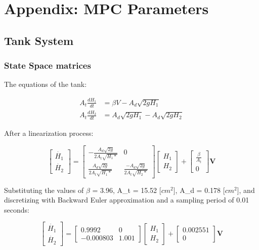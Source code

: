 \chapter{Appendix: MPC Parameters}
\label{chap:Appendix_A}

\section{Tank System}

\subsection{State Space matrices}

The equations of the tank:

\begin{equation}
\begin{align}
A_t\frac{dH_1}{dt} &= \beta V - A_d \sqrt{2gH_1} \\
A_t\frac{dH_2}{dt} &= A_d\sqrt{2gH_1} - A_d\sqrt{2gH_2}
\end{align}
\end{equation}

After a linearization process:

\begin{equation} \label{eq:appendix1}
\begin{bmatrix} \dot{H_1} \\ \dot{H_2} \end{bmatrix} = \begin{bmatrix} -\frac{A_d \sqrt{2g}}{2A_t \sqrt{H_{1}*}} & 0  \\ \frac{A_d \sqrt{2g}}{2A_t \sqrt{H_{1}*}} & \frac{-A_d \sqrt{2g}}{2A_t \sqrt{H_{2}*}} \end{bmatrix} \begin{bmatrix} H_1 \\ H_2 \end{bmatrix} + \begin{bmatrix} \frac{\beta}{A_t} \\ 0 \end{bmatrix} \mathbf{V}
\end{equation} 

Substituting the values of $\beta$ = 3.96, A_t = 15.52 [$cm^2$], A_d = 0.178 [$cm^2$], and discretizing with Backward Euler approximation and a sampling period of 0.01 seconds:

\begin{equation} \label{eq:appendix2}
\begin{bmatrix} \dot{H_1} \\ \dot{H_2} \end{bmatrix} = \begin{bmatrix} 0.9992 & 0  \\ -0.000803 & 1.001 \end{bmatrix} \begin{bmatrix} H_1 \\ H_2 \end{bmatrix} + \begin{bmatrix} 0.002551 \\ 0 \end{bmatrix} \mathbf{V}
\end{equation} 

